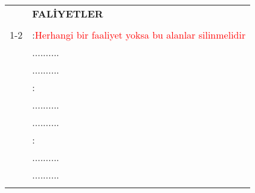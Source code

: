 \begin{table}[ht!]
\begin{center}
\begin{tabular}{p{} p{}}
\begin{comment}
\footnotesize\textbf{AKADEMİK} &\vspace{0.09cm}\hspace{-2.8cm}\footnotesize\textbf{FALİYETLER} \\
&\vspace{-0.2cm}\hspace{-2cm}{\footnotesize \textcolor{red}{(Buradaki Bilgiler Kaynak Gösterimleri ile uyumlu olmalıdır)}}\\
\cmidrule[0.1mm]{1-2} 
\hspace{0.5cm}\textbf{\raggedright \footnotesize Makaleler}			& \hspace{-2cm}:\footnotesize\textcolor{red}{Herhangi bir faaliyet yoksa bu alanlar silinmelidir}\\
\hspace{0.5cm}\textbf{\raggedright \footnotesize 1.}					& \hspace{-2cm}\footnotesize ..........\\
\hspace{0.5cm}\textbf{\raggedright \footnotesize 2.}					& \hspace{-2cm}\footnotesize ..........\\
\hspace{0.5cm}\textbf{\raggedright \footnotesize Bildiriler}			& \hspace{-2cm}\footnotesize :\\
\hspace{0.5cm}\textbf{\raggedright \footnotesize 1.}					& \hspace{-2cm}\footnotesize ..........\\
\hspace{0.5cm}\textbf{\raggedright \footnotesize 2.}					& \hspace{-2cm}\footnotesize ..........\\
\hspace{0.5cm}\textbf{\raggedright \footnotesize Projeler}			& \hspace{-2cm}\footnotesize :\\
\hspace{0.5cm}\textbf{\raggedright \footnotesize 1.}					& \hspace{-2cm}\footnotesize ..........\\
\hspace{0.5cm}\textbf{\raggedright \footnotesize 2.}					& \hspace{-2cm}\footnotesize ..........\\
\end{comment}
\end{tabular}
\end{center}
\end{table}

